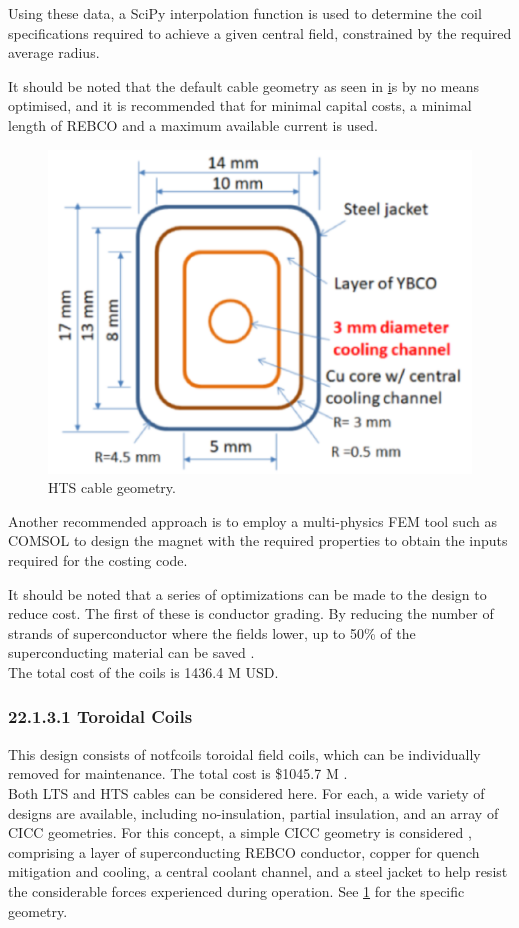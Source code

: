 Using these data, a SciPy interpolation function is used to determine the coil specifications required to achieve a given central field, constrained by the required average radius.

It should be noted that the default cable geometry as seen in \href{fig:yuhu_cs} is by no means optimised, and it is recommended that for minimal capital costs, a minimal length of REBCO and a maximum available current is used.


\begin{figure}[h]
    \centering
    \includegraphics[width =0.5\linewidth]{StandardFigures/yuhu_cs.pdf}
    \caption{HTS cable geometry.}
    \label{fig:yuhu_cs}
\end{figure}

Another recommended approach is to employ a multi-physics FEM tool such as COMSOL to design the magnet with the required properties to obtain the inputs required for the costing code.

It should be noted that a series of optimizations can be made to the design to reduce cost. The first of these is conductor grading. By reducing the number of strands of superconductor where the fields lower, up to 50\% of the superconducting material can be saved \cite{uglietti2018progressing}.\\

The total cost of the coils is 1436.4 M USD.


\subsubsection*{22.1.3.1 Toroidal Coils}

This design consists of notfcoils toroidal field coils, which can be individually removed for maintenance. The total cost is \$1045.7 M .\\

Both LTS and HTS cables can be considered here. For each, a wide variety of designs are available, including no-insulation, partial insulation, and an array of CICC geometries. For this concept, a simple CICC geometry is considered \cite{Menard2016}, comprising a layer of superconducting REBCO conductor, copper for quench mitigation and cooling, a central coolant channel, and a steel jacket to help resist the considerable forces experienced during operation. See \ref{fig:yuhu_cs} for the specific geometry.\\

